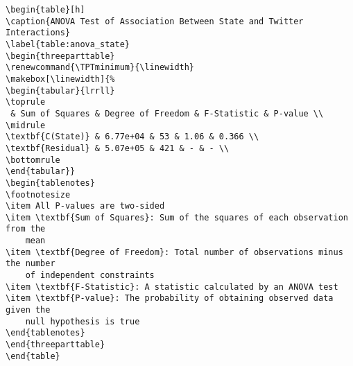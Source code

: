 \documentclass[11pt]{article}
\begin{document}
\begin{Verbatim}[tabsize=4]
\begin{table}[h]
\caption{ANOVA Test of Association Between State and Twitter Interactions}
\label{table:anova_state}
\begin{threeparttable}
\renewcommand{\TPTminimum}{\linewidth}
\makebox[\linewidth]{%
\begin{tabular}{lrrll}
\toprule
 & Sum of Squares & Degree of Freedom & F-Statistic & P-value \\
\midrule
\textbf{C(State)} & 6.77e+04 & 53 & 1.06 & 0.366 \\
\textbf{Residual} & 5.07e+05 & 421 & - & - \\
\bottomrule
\end{tabular}}
\begin{tablenotes}
\footnotesize
\item All P-values are two-sided
\item \textbf{Sum of Squares}: Sum of the squares of each observation from the
	mean
\item \textbf{Degree of Freedom}: Total number of observations minus the number
	of independent constraints
\item \textbf{F-Statistic}: A statistic calculated by an ANOVA test
\item \textbf{P-value}: The probability of obtaining observed data given the
	null hypothesis is true
\end{tablenotes}
\end{threeparttable}
\end{table}

\end{Verbatim}
\end{document}
